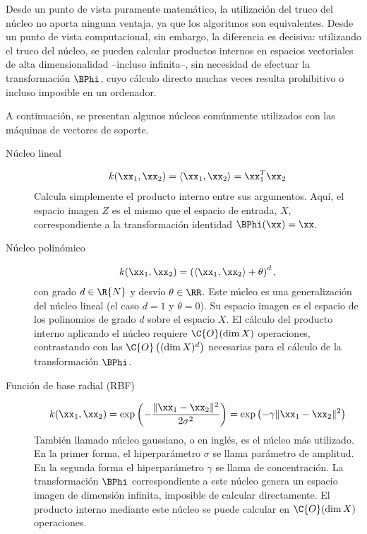 Desde un punto de vista puramente matemático, la utilización del truco
del núcleo no aporta ninguna ventaja, ya que los algoritmos son
equivalentes. Desde un punto de vista computacional, sin embargo, la
diferencia es decisiva: utilizando el truco del núcleo, se pueden
calcular productos internos en espacios vectoriales de alta
dimensionalidad --incluso infinita--, sin necesidad de efectuar la
transformación $\BPhi$, cuyo cálculo directo muchas veces resulta
prohibitivo o incluso imposible en un ordenador.


A continuación, se presentan algunos núcleos comúnmente
utilizados con las máquinas de vectores de soporte.
%
\begin{description}
%
\item[Núcleo lineal]
  \begin{align}
    k(\xx_1,\xx_2)=\langle \xx_1, \xx_2\rangle=\xx_1^T\xx_2
  \end{align}
  Calcula simplemente el producto interno entre sus argumentos. Aquí,
  el espacio imagen $Z$ es el mismo que el espacio de entrada, $X$,
  correspondiente a la transformación identidad $\BPhi(\xx)=\xx$.
%
\item[Núcleo polinómico]
  \begin{align}
    k(\xx_1,\xx_2)=\left(\langle{}\xx_1,\xx_2\rangle+\theta\right)^d,
  \end{align}
  con grado $d\in\R{N}$ y desvío $\theta\in\RR$.  Este núcleo es una
  generalización del núcleo lineal (el caso $d=1$ y $\theta=0$). Su
  espacio imagen es el espacio de los polinomios de grado $d$ sobre el
  espacio $X$.  El cálculo del producto interno aplicando el núcleo
  requiere $\C{O}(\dim{}X)$ operaciones, contrastando con las
  $\C{O}\left((\dim{}X)^d\right)$ necesarias para el cálculo de la
  transformación $\BPhi$.
%
\item[Función de base radial (RBF)]
  \begin{align}
    k(\xx_1,\xx_2)=\exp\left(-\frac{\|\xx_1-\xx_2\|^2}{2\sigma^2}\right)
    =\exp\left(-\gamma\|\xx_1-\xx_2\|^2\right)
  \end{align}
  También llamado núcleo gaussiano, o  en
  inglés, es el núcleo más utilizado.  En la primer forma, el
  hiperparámetro $\sigma$ se llama parámetro de amplitud. En la
  segunda forma el hiperparámetro $\gamma$ se llama de concentración.
  La transformación $\BPhi$ correspondiente a este núcleo genera un
  espacio imagen de dimensión infinita, imposible de calcular
  directamente. El producto interno mediante este núcleo se puede
  calcular en $\C{O}(\dim{}X)$ operaciones.
\end{description}
%

